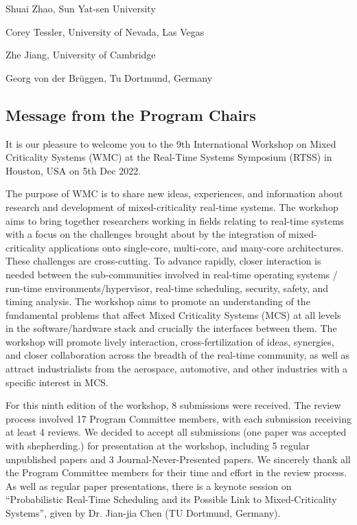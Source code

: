 \documentclass{article}
\begin{document}
Shuai Zhao, Sun Yat-sen University

Corey Tessler, University of Nevada, Las Vegas

Zhe Jiang, University of Cambridge

Georg von der Brüggen, Tu Dortmund, Germany


\clearpage

\begin{center}
  \section*{Message from the Program Chairs}
\end{center}

\vspace{0.5em}

It is our pleasure to welcome you to the 9th International Workshop on Mixed Criticality Systems (WMC) at the Real-Time Systems Symposium (RTSS) in Houston, USA on 5th Dec 2022.

\vspace{0.5em}

The purpose of WMC is to share new ideas, experiences, and information about research and development of mixed-criticality real-time systems. The workshop aims to bring together researchers working in fields relating to real-time systems with a focus on the challenges brought about by the integration of mixed-criticality applications onto single-core, multi-core, and many-core architectures. These challenges are cross-cutting. To advance rapidly, closer interaction is needed between the sub-communities involved in real-time operating systems / run-time environments/hypervisor, real-time scheduling, security, safety, and timing analysis. The workshop aims to promote an understanding of the fundamental problems that affect Mixed Criticality Systems (MCS) at all levels in the software/hardware stack and crucially the interfaces between them. The workshop will promote lively interaction, cross-fertilization of ideas, synergies, and closer collaboration across the breadth of the real-time community, as well as attract industrialists from the aerospace, automotive, and other industries with a specific interest in MCS.

\vspace{0.5em}

For this ninth edition of the workshop, 8 submissions were received. The review process
involved 17 Program Committee members, with each submission receiving at least 4 reviews. We decided to accept all submissions (one paper was accepted with shepherding.) for presentation at the workshop, including 5 regular unpublished papers and 3 Journal-Never-Presented papers. We sincerely thank all the Program Committee members for their time and effort in the review process. As well as regular paper presentations, there is a keynote session on “Probabilistic Real-Time Scheduling and its Possible Link to Mixed-Criticality Systems”, given by Dr. Jian-jia Chen (TU Dortmund, Germany).
\end{document}

